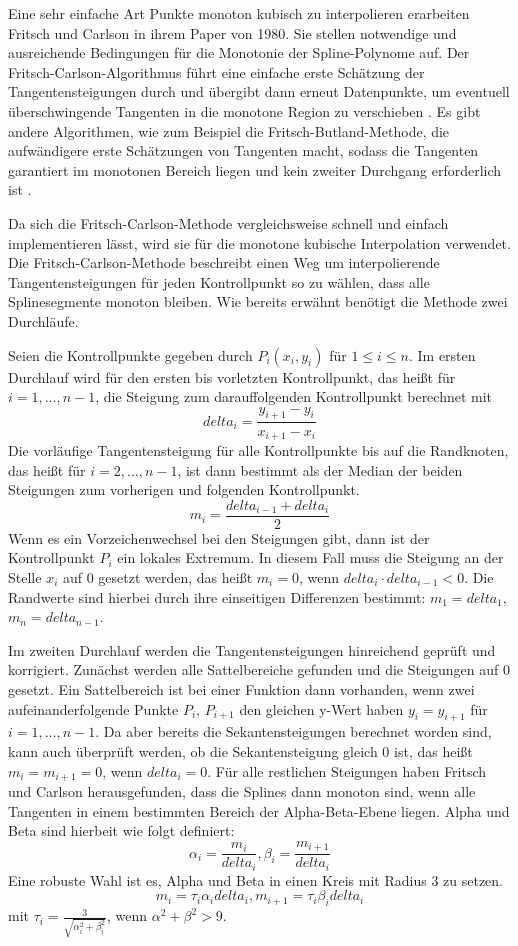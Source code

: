 Eine sehr einfache Art Punkte monoton kubisch zu interpolieren erarbeiten Fritsch und Carlson in ihrem Paper von 1980. Sie stellen notwendige und ausreichende Bedingungen für die Monotonie der Spline-Polynome auf. Der Fritsch-Carlson-Algorithmus führt eine einfache erste Schätzung der Tangentensteigungen durch und übergibt dann erneut Datenpunkte, um eventuell überschwingende Tangenten in die monotone Region zu verschieben \cite{Fritschcarlson:1980}. Es gibt andere Algorithmen, wie zum Beispiel die Fritsch-Butland-Methode, die aufwändigere erste Schätzungen von Tangenten macht, sodass die Tangenten garantiert im monotonen Bereich liegen und kein zweiter Durchgang erforderlich ist \cite{Fritschbutland:1984}.

Da sich die Fritsch-Carlson-Methode vergleichsweise schnell und einfach implementieren lässt, wird sie für die monotone kubische Interpolation verwendet. Die Fritsch-Carlson-Methode beschreibt einen Weg um interpolierende Tangentensteigungen für jeden Kontrollpunkt so zu wählen, dass alle Splinesegmente monoton bleiben. Wie bereits erwähnt benötigt die Methode zwei Durchläufe. 

Seien die Kontrollpunkte gegeben durch $P_i(x_i,y_i)$ für $1\le i \le n$.
Im ersten Durchlauf wird für den ersten bis vorletzten Kontrollpunkt, das heißt für $i=1,\dots,n-1$, die Steigung zum darauffolgenden Kontrollpunkt berechnet mit 
$$delta_i=\frac{y_{i+1}-y_i}{x_{i+1}-x_i}$$
Die vorläufige Tangentensteigung für alle Kontrollpunkte bis auf die Randknoten, das heißt für $i=2,\dots,n-1$, ist dann bestimmt als der Median der beiden Steigungen zum vorherigen und folgenden Kontrollpunkt.
$$m_i=\frac{delta_{i-1}+delta_i}{2}$$
Wenn es ein Vorzeichenwechsel bei den Steigungen gibt, dann ist der Kontrollpunkt $P_i$ ein lokales Extremum. In diesem Fall muss die Steigung an der Stelle $x_i$ auf $0$ gesetzt werden, das heißt
$m_i=0$, wenn $delta_i\cdot delta_{i-1} < 0$.
Die Randwerte sind hierbei durch ihre einseitigen Differenzen bestimmt:
$m_1=delta_1$, $m_{n}=delta_{n-1}$.

Im zweiten Durchlauf werden die Tangentensteigungen hinreichend geprüft und korrigiert. Zunächst werden alle Sattelbereiche gefunden und die Steigungen auf $0$ gesetzt. Ein Sattelbereich ist bei einer Funktion dann vorhanden, wenn zwei aufeinanderfolgende Punkte $P_i$, $P_{i+1}$ den gleichen y-Wert haben $y_i=y_{i+1}$ für $i=1,\dots,n-1$. Da aber bereits die Sekantensteigungen berechnet worden sind, kann auch überprüft werden, ob die Sekantensteigung gleich $0$ ist, das heißt $m_i=m_{i+1}=0$, wenn $delta_i=0$. Für alle restlichen Steigungen haben Fritsch und Carlson herausgefunden, dass die Splines dann monoton sind, wenn alle Tangenten in einem bestimmten Bereich der Alpha-Beta-Ebene liegen.
Alpha und Beta sind hierbeit wie folgt definiert: 
$$\alpha_i =\frac{m_i}{delta_i}, \beta_i =\frac{m_{i+1}}{delta_i}$$
Eine robuste Wahl ist es, Alpha und Beta in einen Kreis mit Radius 3 zu setzen.
$$m_i=\tau_i\alpha_i delta_i, m_{i+1}=\tau_i\beta_i delta_i$$ mit $\tau_i=\frac{3}{\sqrt{\alpha_i^2+\beta_i^2}}$, wenn $\alpha^2+\beta^2>9$. \cite{Fritschcarlson:1980}

